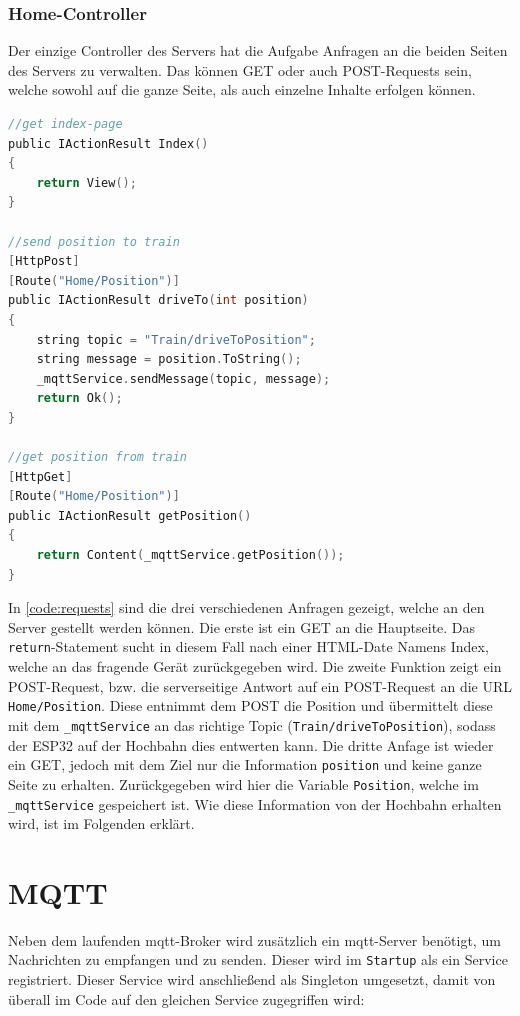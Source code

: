\subsubsection{Home-Controller}
Der einzige Controller des Servers hat die Aufgabe Anfragen an die beiden Seiten des Servers zu verwalten. Das können GET oder auch POST-Requests sein, welche sowohl auf die ganze Seite, als auch einzelne Inhalte erfolgen können.

\begin{lstlisting}[language=c, style=dhpaperdefault]
//get index-page
public IActionResult Index()
{
	return View();
}

//send position to train
[HttpPost]
[Route("Home/Position")]
public IActionResult driveTo(int position)
{
	string topic = "Train/driveToPosition";
	string message = position.ToString();
	_mqttService.sendMessage(topic, message);
	return Ok();
}

//get position from train
[HttpGet]
[Route("Home/Position")]
public IActionResult getPosition()
{
	return Content(_mqttService.getPosition());
}
\end{lstlisting}
\vspace{0.5cm}

In \autoref{code:requests} sind die drei verschiedenen Anfragen gezeigt, welche an den Server gestellt werden können. Die erste ist ein GET an die Hauptseite. Das \texttt{return}-Statement sucht in diesem Fall nach einer HTML-Date Namens Index, welche an das fragende Gerät zurückgegeben wird. Die zweite Funktion zeigt ein POST-Request, bzw. die serverseitige Antwort auf ein POST-Request an die URL \texttt{Home/Position}. Diese entnimmt dem POST die Position und übermittelt diese mit dem \texttt{\_mqttService} an das richtige Topic (\texttt{Train/driveToPosition}), sodass der ESP32 auf der Hochbahn dies entwerten kann. Die dritte Anfage ist wieder ein GET, jedoch mit dem Ziel nur die Information \texttt{position} und keine ganze Seite zu erhalten. Zurückgegeben wird hier die Variable \texttt{Position}, welche im \texttt{\_mqttService} gespeichert ist. Wie diese Information von der Hochbahn erhalten wird, ist im Folgenden erklärt.
\section{MQTT}
\label{sec:serverMqtt}
Neben dem laufenden \acrshort{mqtt}-Broker wird zusätzlich ein \acrshort{mqtt}-Server benötigt, um Nachrichten zu empfangen und zu senden. Dieser wird im \texttt{Startup} als ein Service registriert. Dieser Service wird anschließend als Singleton umgesetzt, damit von überall im Code auf den gleichen Service zugegriffen wird:

